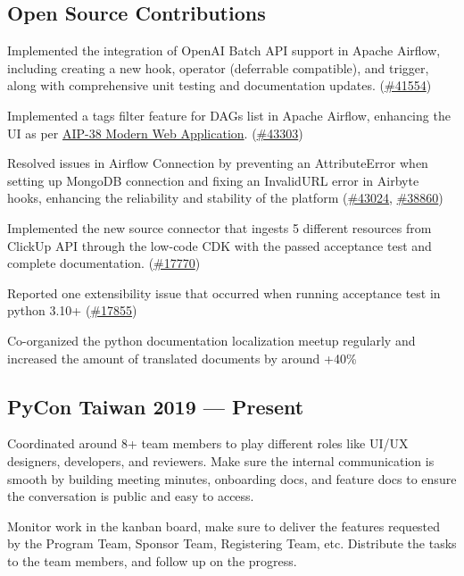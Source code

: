 \subsection{{Open Source Contributions}}
\begin{zitemize}
\item Implemented the integration of OpenAI Batch API support in Apache Airflow, including creating a new hook, operator (deferrable compatible), and trigger, along with comprehensive unit testing and documentation updates. (\href{https://github.com/apache/airflow/pull/41554}{\#41554})
\item Implemented a tags filter feature for DAGs list in Apache Airflow, enhancing the UI as per \href{https://cwiki.apache.org/confluence/display/AIRFLOW/AIP-38+Modern+Web+Application}{AIP-38 Modern Web Application}. (\href{https://github.com/apache/airflow/pull/43303}{\#43303})
\item Resolved issues in Airflow Connection by preventing an AttributeError when setting up MongoDB connection and fixing an InvalidURL error in Airbyte hooks, enhancing the reliability and stability of the platform (\href{https://github.com/apache/airflow/pull/43024}{\#43024}, \href{https://github.com/apache/airflow/pull/38860}{\#38860})
\end{zitemize}
\begin{zitemize}
\item Implemented the new source connector that ingests 5 different resources from ClickUp API through the low-code CDK with the passed acceptance test and complete documentation. (\href{https://github.com/airbytehq/airbyte/pull/17770}{\#17770})
\item Reported one extensibility issue that occurred when running acceptance test in python 3.10+ (\href{https://github.com/airbytehq/airbyte/issues/17855}{\#17855})
\end{zitemize}
\begin{zitemize}
\item Co-organized the python documentation localization meetup regularly and increased the amount of translated documents by around +40\%
\end{zitemize}

\subsection{{PyCon Taiwan \hfill 2019 --- Present}}
\begin{zitemize}
  \item Coordinated around 8+ team members to play different roles like UI/UX designers, developers, and reviewers. Make sure the internal communication is smooth by building meeting minutes, onboarding docs, and feature docs to ensure the conversation is public and easy to access.
  \item Monitor work in the kanban board, make sure to deliver the features requested by the Program Team, Sponsor Team, Registering Team, etc. Distribute the tasks to the team members, and follow up on the progress.
\end{zitemize}


